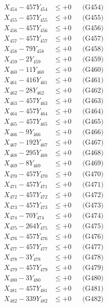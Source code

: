 \documentclass[a4paper,10pt]{article}
\begin{document}
{\begin{align}
X_{454} - 457Y_{454} &\leq +0 && \text{(G454)} \\
X_{455} - 457Y_{455} &\leq +0 && \text{(G455)} \\
X_{456} - 457Y_{456} &\leq +0 && \text{(G456)} \\
X_{457} - 457Y_{457} &\leq +0 && \text{(G457)} \\
X_{458} - 79Y_{458} &\leq +0 && \text{(G458)} \\
X_{459} - 2Y_{459} &\leq +0 && \text{(G459)} \\
X_{460} - 11Y_{460} &\leq +0 && \text{(G460)} \\
\allowbreak
X_{461} - 416Y_{461} &\leq +0 && \text{(G461)} \\
X_{462} - 28Y_{462} &\leq +0 && \text{(G462)} \\
X_{463} - 457Y_{463} &\leq +0 && \text{(G463)} \\
X_{464} - 457Y_{464} &\leq +0 && \text{(G464)} \\
X_{465} - 457Y_{465} &\leq +0 && \text{(G465)} \\
X_{466} - 9Y_{466} &\leq +0 && \text{(G466)} \\
X_{467} - 192Y_{467} &\leq +0 && \text{(G467)} \\
X_{468} - 295Y_{468} &\leq +0 && \text{(G468)} \\
X_{469} - 8Y_{469} &\leq +0 && \text{(G469)} \\
X_{470} - 457Y_{470} &\leq +0 && \text{(G470)} \\
\allowbreak
X_{471} - 457Y_{471} &\leq +0 && \text{(G471)} \\
X_{472} - 457Y_{472} &\leq +0 && \text{(G472)} \\
X_{473} - 457Y_{473} &\leq +0 && \text{(G473)} \\
X_{474} - 70Y_{474} &\leq +0 && \text{(G474)} \\
X_{475} - 264Y_{475} &\leq +0 && \text{(G475)} \\
X_{476} - 457Y_{476} &\leq +0 && \text{(G476)} \\
X_{477} - 457Y_{477} &\leq +0 && \text{(G477)} \\
X_{478} - 3Y_{478} &\leq +0 && \text{(G478)} \\
X_{479} - 457Y_{479} &\leq +0 && \text{(G479)} \\
X_{480} - 3Y_{480} &\leq +0 && \text{(G480)} \\
\allowbreak
X_{481} - 457Y_{481} &\leq +0 && \text{(G481)} \\
X_{482} - 339Y_{482} &\leq +0 && \text{(G482)} \\

\end{align}}
\end{document}
